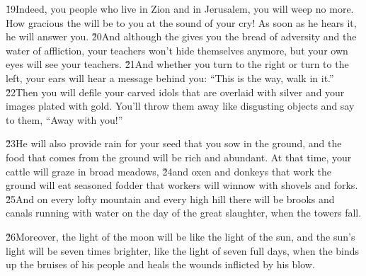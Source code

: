 \v{19}Indeed, you people who live in Zion and in Jerusalem, you will weep no more. How gracious the  will be to you at the sound of your cry! As soon as he hears it, he will answer you. \v{20}And although the  gives you the bread of adversity and the water of affliction, your teachers won't hide themselves anymore, but your own eyes will see your teachers. \v{21}And whether you turn to the right or turn to the left, your ears will hear a message behind you: ``This is the way, walk in it.'' \v{22}Then you will defile your carved idols that are overlaid with silver and your images plated with gold. You'll throw them away like disgusting objects and say to them, ``Away with you!''

\v{23}He will also provide rain for your seed that you sow in the ground, and the food that comes from the ground will be rich and abundant. At that time, your cattle will graze in broad meadows, \v{24}and oxen and donkeys that work the ground will eat seasoned fodder that workers will winnow with shovels and forks. \v{25}And on every lofty mountain and every high hill there will be brooks and canals running with water on the day of the great slaughter, when the towers fall.

\v{26}Moreover, the light of the moon will be like the light of the sun, and the sun's light will be seven times brighter, like the light of seven full days, when the  binds up the bruises of his people and heals the wounds inflicted by his blow.

